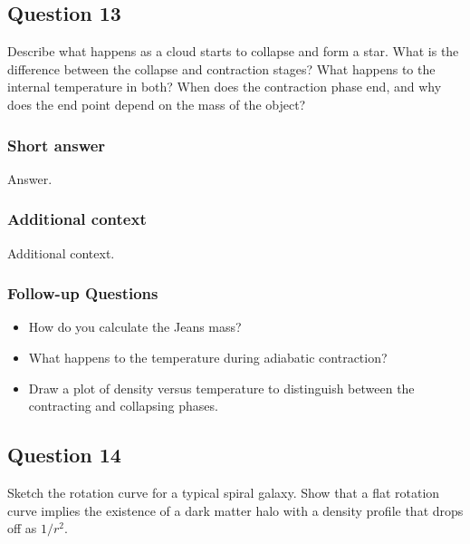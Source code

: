 \documentclass[a4paper,10pt]{article}
\begin{document}

\newpage
\subsection{Question 13}

Describe what happens as a cloud starts to collapse and form a star. What is the difference between the collapse and contraction stages? What happens to the internal temperature in both? When does the contraction phase end, and why does the end point depend on the mass of the object?

\subsubsection{Short answer}

Answer.

\subsubsection{Additional context}

Additional context.

\subsubsection{Follow-up Questions}

\begin{itemize}
    \item How do you calculate the Jeans mass?
    \item What happens to the temperature during adiabatic contraction?
    \item Draw a plot of density versus temperature to distinguish between the contracting and collapsing phases.
\end{itemize}


\newpage
\subsection{Question 14}

Sketch the rotation curve for a typical spiral galaxy. Show that a flat rotation curve implies the existence of a dark matter halo with a density profile that drops off as $1/r^2$.
\end{document}
